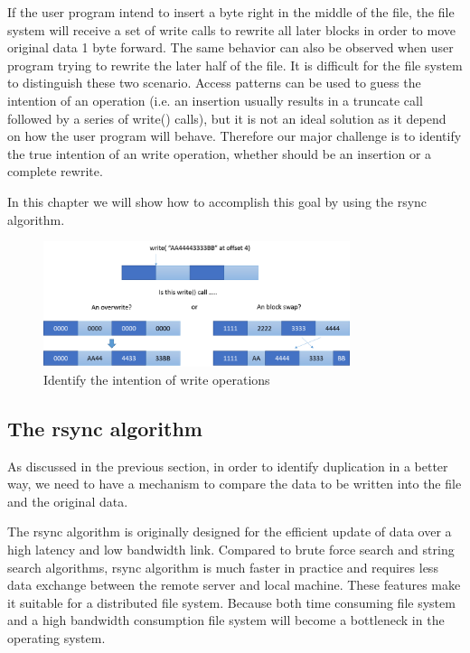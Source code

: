     If the user program intend to insert a byte right in the middle of the file, the file system will receive a set of write calls to rewrite all later blocks in order to move original data 1 byte forward. The same behavior can also be observed when user program trying to rewrite the later half of the file. It is difficult for the file system to distinguish these two scenario. Access patterns can be used to guess the intention of an operation (i.e. an insertion usually results in a truncate call followed by a series of write() calls), but it is not an ideal solution as it depend on how the user program will behave. Therefore our major challenge is to identify the true intention of an write operation, whether should be an insertion or a complete rewrite.

    In this chapter we will show how to accomplish this goal by using the rsync algorithm.

\begin{figure}[hbtp]
\centering
\includegraphics[width=0.8\textwidth]{Chapter-4/figs/fig6.png}
\caption{Identify the intention of write operations}
\label{fig:write_intention}
\end{figure}

\subsection{The rsync algorithm}

    As discussed in the previous section, in order to identify duplication in a better way, we need to have a mechanism to compare the data to be written into the file and the original data. 
    
    The rsync algorithm is originally designed for the efficient update of data over a high latency and low bandwidth link. Compared to brute force search and string search algorithms, rsync algorithm is much faster in practice and requires less data exchange between the remote server and local machine. These features make it suitable for a distributed file system. Because both time consuming file system and a high bandwidth consumption file system will become a bottleneck in the operating system.

